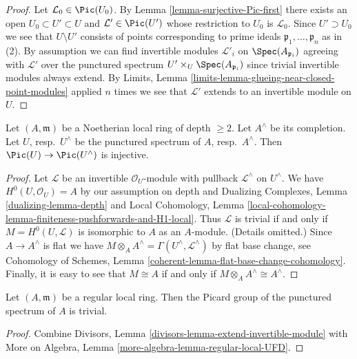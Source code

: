 \begin{proof}
Let $\mathcal{L}_0 \in \Pic(U_0)$. By
Lemma \ref{lemma-surjective-Pic-first}
there exists an open $U_0 \subset U' \subset U$
and $\mathcal{L}' \in \Pic(U')$ whose restriction
to $U_0$ is $\mathcal{L}_0$.
Since $U' \supset U_0$ we see that $U \setminus U'$
consists of points corresponding to prime ideals
$\mathfrak p_1, \ldots, \mathfrak p_n$ as in (2).
By assumption we can find invertible modules
$\mathcal{L}'_i$ on $\Spec(A_{\mathfrak p_i})$ agreeing with
$\mathcal{L}'$ over the punctured spectrum
$U' \times_U \Spec(A_{\mathfrak p_i})$ since
trivial invertible modules always extend.
By Limits, Lemma \ref{limits-lemma-glueing-near-closed-point-modules}
applied $n$ times we see that $\mathcal{L}'$ extends to an
invertible module on $U$.
\end{proof}

\begin{lemma}
\label{lemma-local-pic-to-completion}
Let $(A, \mathfrak m)$ be a Noetherian local ring of depth $\geq 2$.
Let $A^\wedge$ be its completion. Let $U$, resp.\ $U^\wedge$
be the punctured spectrum of $A$, resp.\ $A^\wedge$. Then
$\Pic(U) \to \Pic(U^\wedge)$ is injective.
\end{lemma}

\begin{proof}
Let $\mathcal{L}$ be an invertible $\mathcal{O}_U$-module
with pullback $\mathcal{L}^\wedge$ on $U^\wedge$.
We have $H^0(U, \mathcal{O}_U) = A$ by our assumption on depth and
Dualizing Complexes, Lemma \ref{dualizing-lemma-depth} and
Local Cohomology, Lemma
\ref{local-cohomology-lemma-finiteness-pushforwards-and-H1-local}.
Thus $\mathcal{L}$ is trivial if and only if
$M = H^0(U, \mathcal{L})$ is isomorphic to $A$ as an $A$-module.
(Details omitted.) Since $A \to A^\wedge$ is flat
we have $M \otimes_A A^\wedge = \Gamma(U^\wedge, \mathcal{L}^\wedge)$
by flat base change, see
Cohomology of Schemes, Lemma \ref{coherent-lemma-flat-base-change-cohomology}.
Finally, it is easy to see that $M \cong A$ if and only if
$M \otimes_A A^\wedge \cong A^\wedge$.
\end{proof}

\begin{lemma}
\label{lemma-trivial-local-pic-regular}
Let $(A, \mathfrak m)$ be a regular local ring. Then the Picard
group of the punctured spectrum of $A$ is trivial.
\end{lemma}

\begin{proof}
Combine Divisors, Lemma \ref{divisors-lemma-extend-invertible-module}
with More on Algebra, Lemma \ref{more-algebra-lemma-regular-local-UFD}.
\end{proof}

